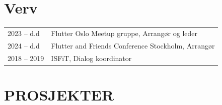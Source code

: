 \documentclass[a4paper,10pt]{article}
\begin{document}
\section{Verv}
\begin{tabularx}{\linewidth}{@{}lX@{}}
2023 -- d.d & Flutter Oslo Meetup gruppe, Arrangør og leder \\
2024 -- d.d & Flutter and Friends Conference Stockholm, Arrangør \\
2018 -- 2019 & ISFiT, Dialog koordinator \\
\end{tabularx}
\vspace{1em}

\section{{\Huge \ubuntu PROSJEKTER}}
\end{document}
